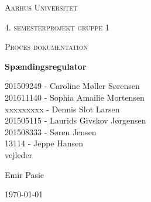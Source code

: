 
\thispagestyle{empty}
{\centering
	{\scshape\LARGE Aarhus Universitet \par}
	\vspace{1cm}
	{\scshape\Large 4. semesterprojekt gruppe 1\par}
	{\scshape\Large Proces dokumentation\par}
	\vspace{1.5cm}
	{\huge\bfseries Spændingsregulator\par}
	\vspace{2cm}
	{\Large
		201509249 - Caroline Møller Sørensen\\
		201611140 - Sophia Amailie Mortensen\\
		xxxxxxxxx - Dennis Slot Larsen \\
		201505115 - Laurids Givskov Jørgensen\\
		201508333 - Søren Jensen\\
	13114 - Jeppe Hansen\\   }
	\vfill
	vejleder\par
	Emir Pasic
	
	\vfill
	
	{\large \today\par}
	\par}



